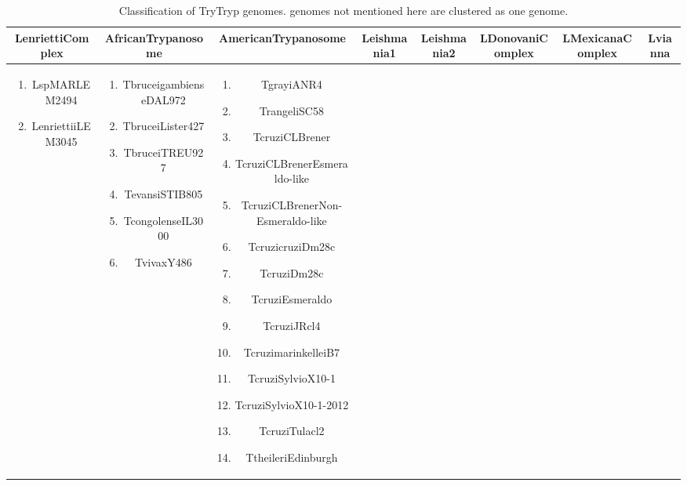 \documentclass[
10pt, %
a4paper, %
oneside, %
headinclude,footinclude, %
BCOR5mm, %
]{scrartcl}
\begin{document}
\begin{table}[hbt] 
\caption{Classification of TryTryp genomes. genomes not mentioned here are clustered as one genome.}
\begin{adjustbox}{width=\columnwidth,center}
\begin{tabular}{|c|c|c|c|c|c|c|c|}
        \toprule LenriettiComplex & AfricanTrypanosome & AmericanTrypanosome & Leishmania1 & Leishmania2 &LDonovaniComplex & LMexicanaComplex & Lvianna \\\midrule
        \parbox{.45\textwidth} {\begin{enumerate}
            \item LspMARLEM2494
            \item LenriettiiLEM3045
        \end{enumerate}} & \parbox{.45\textwidth}{\begin{enumerate}
            \item TbruceigambienseDAL972
            \item TbruceiLister427
            \item TbruceiTREU927
            \item TevansiSTIB805
            \item TcongolenseIL3000
            \item TvivaxY486
        \end{enumerate}} & \parbox{.45\textwidth}{\begin{enumerate}
            \item TgrayiANR4
            \item TrangeliSC58
            \item TcruziCLBrener
            \item TcruziCLBrenerEsmeraldo-like
            \item TcruziCLBrenerNon-Esmeraldo-like
            \item TcruzicruziDm28c
            \item TcruziDm28c
            \item TcruziEsmeraldo
            \item TcruziJRcl4
            \item TcruzimarinkelleiB7
            \item TcruziSylvioX10-1
            \item TcruziSylvioX10-1-2012
            \item TcruziTulacl2
            \item TtheileriEdinburgh
        \end{enumerate}} & \parbox{.45\textwidth}{\begin{enumerate}

\end{enumerate}}
\end{tabular}
\end{adjustbox}
\end{table}
\end{document}
